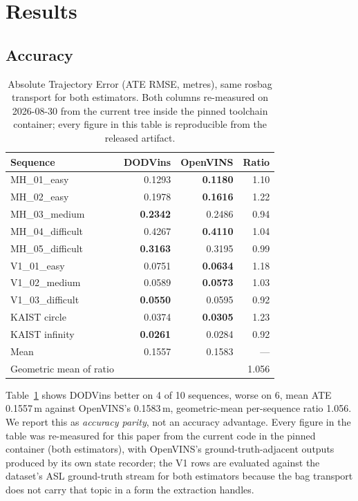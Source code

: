 \documentclass[10pt,conference,letterpaper]{IEEEtran}
\begin{document}
\section{Results}
\label{sec:results}

\subsection{Accuracy}

\begin{table}[t]
\caption{Absolute Trajectory Error (ATE RMSE, metres), same rosbag transport
for both estimators. Both columns re-measured on 2026-08-30 from the current
tree inside the pinned toolchain container; every figure in this table is
reproducible from the released artifact.}
\label{tab:ate}
\centering
\begin{tabular}{lrrr}
\toprule
Sequence & DODVins & OpenVINS & Ratio \\
\midrule
MH\_01\_easy      & 0.1293 & \textbf{0.1180} & 1.10 \\
MH\_02\_easy      & 0.1978 & \textbf{0.1616} & 1.22 \\
MH\_03\_medium    & \textbf{0.2342} & 0.2486 & 0.94 \\
MH\_04\_difficult & 0.4267 & \textbf{0.4110} & 1.04 \\
MH\_05\_difficult & \textbf{0.3163} & 0.3195 & 0.99 \\
V1\_01\_easy      & 0.0751 & \textbf{0.0634} & 1.18 \\
V1\_02\_medium    & 0.0589 & \textbf{0.0573} & 1.03 \\
V1\_03\_difficult & \textbf{0.0550} & 0.0595 & 0.92 \\
KAIST circle      & 0.0374 & \textbf{0.0305} & 1.23 \\
KAIST infinity    & \textbf{0.0261} & 0.0284 & 0.92 \\
\midrule
Mean              & 0.1557 & 0.1583 & --- \\
Geometric mean of ratio & \multicolumn{2}{c}{} & 1.056 \\
\bottomrule
\end{tabular}
\end{table}

Table~\ref{tab:ate} shows DODVins better on 4 of 10 sequences,
worse on 6, mean ATE 0.1557\,m against OpenVINS's 0.1583\,m, geometric-mean
per-sequence ratio 1.056. We report this as \emph{accuracy parity}, not an
accuracy advantage. Every figure in the table was re-measured for this paper
from the current code in the pinned container (both estimators), with
OpenVINS's ground-truth-adjacent outputs produced by its own state recorder;
the V1 rows are evaluated against the dataset's ASL ground-truth stream for
both estimators because the bag transport does not carry that topic in a
form the extraction handles.
\end{document}
